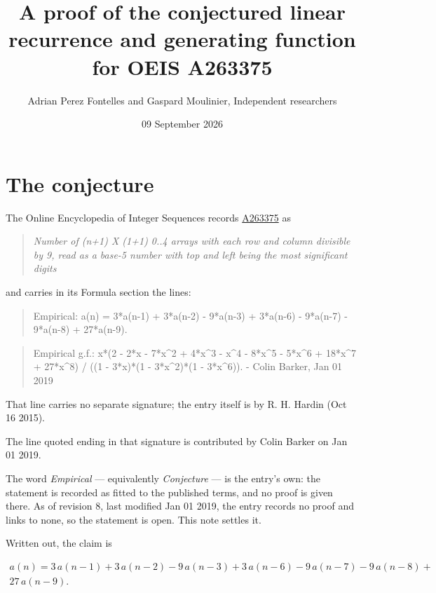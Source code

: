 \documentclass[11pt]{article}
\title{A proof of the conjectured linear recurrence and generating function for OEIS A263375}
\author{Adrian Perez Fontelles and Gaspard Moulinier, Independent researchers}
\date{09 September 2026}
\theoremstyle{definition}
\begin{document}
\maketitle
\section{The conjecture}

The Online Encyclopedia of Integer Sequences records \href{https://oeis.org/A263375}{A263375} as

\begin{quote}\itshape Number of (n+1) X (1+1) 0..4 arrays with each row and column divisible by 9, read as a base-5 number with top and left being the most significant digits\end{quote}

and carries in its Formula section the lines:

\begin{quote}\ttfamily Empirical: a(n) = 3*a(n-1) + 3*a(n-2) - 9*a(n-3) + 3*a(n-6) - 9*a(n-7) - 9*a(n-8) + 27*a(n-9).\end{quote}

\begin{quote}\ttfamily Empirical g.f.: x*(2 - 2*x - 7*x\textasciicircum{}2 + 4*x\textasciicircum{}3 - x\textasciicircum{}4 - 8*x\textasciicircum{}5 - 5*x\textasciicircum{}6 + 18*x\textasciicircum{}7 + 27*x\textasciicircum{}8) / ((1 - 3*x)*(1 - 3*x\textasciicircum{}2)*(1 - 3*x\textasciicircum{}6)). - Colin Barker, Jan 01 2019\end{quote}

That line carries no separate signature; the entry itself is by R. H. Hardin (Oct 16 2015).

The line quoted ending in that signature is contributed by Colin Barker on Jan 01 2019.

The word {\itshape Empirical} --- equivalently {\itshape Conjecture} --- is the entry's own: the statement is recorded as fitted to the published terms, and no proof is given there. As of revision 8, last modified Jan 01 2019, the entry records no proof and links to none, so the statement is open. This note settles it.

Written out, the claim is

\begin{multline*} a(n) = 3\,a(n-1) + 3\,a(n-2) - 9\,a(n-3) + 3\,a(n-6) - 9\,a(n-7) - 9\,a(n-8) + \\ 27\,a(n-9). \end{multline*}
\end{document}
